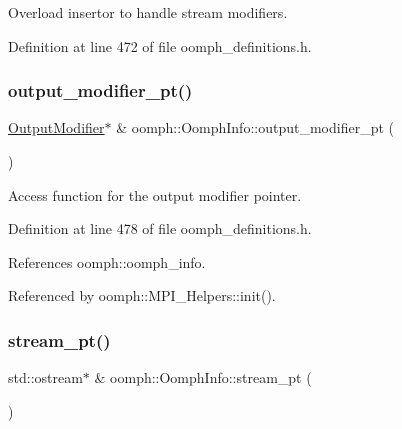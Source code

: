 Overload insertor to handle stream modifiers. 



Definition at line 472 of file oomph\+\_\+definitions.\+h.

\mbox{\label{classoomph_1_1OomphInfo_a0ab0a9107331f457e354f47ea26cc772}} 
\subsubsection{\texorpdfstring{output\+\_\+modifier\+\_\+pt()}{output\_modifier\_pt()}}
{\footnotesize\ttfamily \hyperlink{classoomph_1_1OutputModifier}{Output\+Modifier}$\ast$ \& oomph\+::\+Oomph\+Info\+::output\+\_\+modifier\+\_\+pt (\begin{DoxyParamCaption}{ }\end{DoxyParamCaption})\hspace{0.3cm}{\ttfamily [inline]}}



Access function for the output modifier pointer. 



Definition at line 478 of file oomph\+\_\+definitions.\+h.



References oomph\+::oomph\+\_\+info.



Referenced by oomph\+::\+M\+P\+I\+\_\+\+Helpers\+::init().

\mbox{\label{classoomph_1_1OomphInfo_a4734a15b11ec273352643fc4f3594217}} 
\subsubsection{\texorpdfstring{stream\+\_\+pt()}{stream\_pt()}}
{\footnotesize\ttfamily std\+::ostream$\ast$ \& oomph\+::\+Oomph\+Info\+::stream\+\_\+pt (\begin{DoxyParamCaption}{ }\end{DoxyParamCaption})\hspace{0.3cm}{\ttfamily [inline]}}



